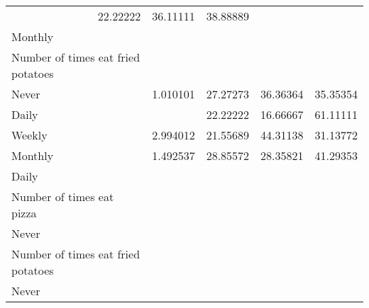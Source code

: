 \documentclass{article}
\begin{document}
\begin{tabular}{lllll}
  \multicolumn{1}{r}{22.22222} &
  \multicolumn{1}{r}{36.11111} &
  \multicolumn{1}{r}{38.88889} \\
\multicolumn{1}{l}{\hspace{3em}Monthly} &
  \multicolumn{1}{|r}{} &
  \multicolumn{1}{r}{} &
  \multicolumn{1}{r}{} &
  \multicolumn{1}{r}{} \\
\multicolumn{1}{l}{\hspace{4em}Number of times eat fried potatoes} &
  \multicolumn{1}{|r}{} &
  \multicolumn{1}{r}{} &
  \multicolumn{1}{r}{} &
  \multicolumn{1}{r}{} \\
\multicolumn{1}{l}{\hspace{5em}Never} &
  \multicolumn{1}{|r}{1.010101} &
  \multicolumn{1}{r}{27.27273} &
  \multicolumn{1}{r}{36.36364} &
  \multicolumn{1}{r}{35.35354} \\
\multicolumn{1}{l}{\hspace{5em}Daily} &
  \multicolumn{1}{|r}{} &
  \multicolumn{1}{r}{22.22222} &
  \multicolumn{1}{r}{16.66667} &
  \multicolumn{1}{r}{61.11111} \\
\multicolumn{1}{l}{\hspace{5em}Weekly} &
  \multicolumn{1}{|r}{2.994012} &
  \multicolumn{1}{r}{21.55689} &
  \multicolumn{1}{r}{44.31138} &
  \multicolumn{1}{r}{31.13772} \\
\multicolumn{1}{l}{\hspace{5em}Monthly} &
  \multicolumn{1}{|r}{1.492537} &
  \multicolumn{1}{r}{28.85572} &
  \multicolumn{1}{r}{28.35821} &
  \multicolumn{1}{r}{41.29353} \\
\multicolumn{1}{l}{\hspace{1em}Daily} &
  \multicolumn{1}{|r}{} &
  \multicolumn{1}{r}{} &
  \multicolumn{1}{r}{} &
  \multicolumn{1}{r}{} \\
\multicolumn{1}{l}{\hspace{2em}Number of times eat pizza} &
  \multicolumn{1}{|r}{} &
  \multicolumn{1}{r}{} &
  \multicolumn{1}{r}{} &
  \multicolumn{1}{r}{} \\
\multicolumn{1}{l}{\hspace{3em}Never} &
  \multicolumn{1}{|r}{} &
  \multicolumn{1}{r}{} &
  \multicolumn{1}{r}{} &
  \multicolumn{1}{r}{} \\
\multicolumn{1}{l}{\hspace{4em}Number of times eat fried potatoes} &
  \multicolumn{1}{|r}{} &
  \multicolumn{1}{r}{} &
  \multicolumn{1}{r}{} &
  \multicolumn{1}{r}{} \\
\multicolumn{1}{l}{\hspace{5em}Never} &

\end{tabular}
\end{document}
